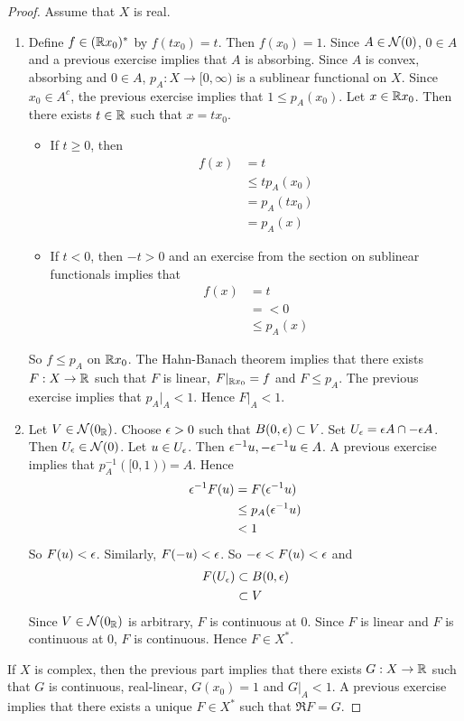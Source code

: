 \documentclass{book}
\begin{document}
	\begin{proof} Assume that $X$ is real.
		\begin{enumerate}
			\item Define $f \in (\mathbb{R} x_0)^*$ by $f(tx_0) = t$. Then $f(x_0) = 1$. Since $A \in \mathcal{N}(0)$, $0 \in A$ and a previous exercise implies that $A$ is absorbing. Since $A$ is convex, absorbing and $0 \in A$, $p_A:X \rightarrow [0, \infty)$ is a sublinear functional on $X$. Since $x_0 \in A^c$, the previous exercise implies that $1 \leq p_A(x_0)$. Let $x \in \mathbb{R} x_0$. Then there exists $t \in \mathbb{R}$ such that $x = tx_0$. 
			\begin{itemize}
				\item If $t \geq 0$, then 
				\begin{align*}
					f(x)
					&= t \\
					&\leq tp_A(x_0) \\
					&= p_A(tx_0) \\
					&= p_A(x)
				\end{align*}
				\item If $t<0$, then $-t >0$ and an exercise from the section on sublinear functionals implies that
				\begin{align*}
					f(x)
					&= t \\
					&= < 0 \\
					& \leq p_A(x)
				\end{align*}
			\end{itemize}
				So $f \leq p_A$ on $\mathbb{R} x_0$. The Hahn-Banach theorem implies that there exists $F:X \rightarrow \mathbb{R}$ such that $F$ is linear, $F|_{\mathbb{R} x_0} = f$ and $F \leq p_A$. The previous exercise implies that  $p_A|_A < 1$. Hence $F|_A < 1$. 
		\item Let $V \in \mathcal{N}(0_{\mathbb{R}})$. Choose $\epsilon >0$ such that $B(0,\epsilon) \subset V$. Set $U_{\epsilon} = \epsilon A \cap -\epsilon A$. Then $U_{\epsilon} \in \mathcal{N}(0)$. Let $u \in U_{\epsilon}$. Then $\epsilon^{-1}u, -\epsilon^{-1}u \in A$. A previous exercise implies that $p_A^{-1}([0,1)) = A$. Hence 
		\begin{align*}
			\epsilon^{-1}F(u)
			&= F(\epsilon^{-1}u) \\
			&\leq p_A(\epsilon^{-1} u) \\
			&< 1
		\end{align*}
		So $F(u) < \epsilon$. Similarly, $F(-u) < \epsilon$. So $-\epsilon < F(u) < \epsilon$ and
		\begin{align*}
			F(U_{\epsilon}) 
			&\subset B(0, \epsilon) \\
			& \subset V 
		\end{align*}
		Since $V \in \mathcal{N}(0_{\mathbb{R}})$ is arbitrary, $F$ is continuous at $0$. Since $F$ is linear and $F$ is continuous at $0$, $F$ is continuous. Hence $F \in X^*$.
		\end{enumerate}
	If $X$ is complex, then the previous part implies that there exists $G:X \rightarrow \mathbb{R}$ such that $G$ is continuous, real-linear, $G(x_0) = 1$ and $G|_A < 1$. A previous exercise implies that there exists a unique $F \in X^*$ such that $\Re F = G$.
	\end{proof}
\end{document}
